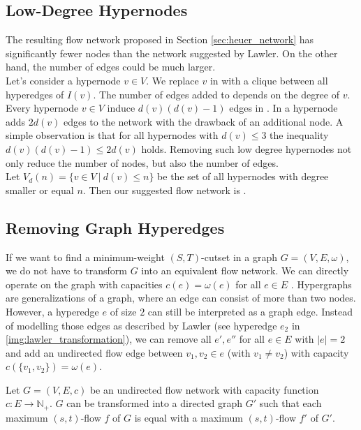 \subsection{Low-Degree Hypernodes}
\label{sec:degree_network}

The resulting flow network  proposed in Section \ref{sec:heuer_network} has significantly
fewer nodes than the network  suggested by Lawler. On the other hand, the number of
edges could be much larger. \\
Let's consider a hypernode $v \in V$. We replace $v$ in  with a clique between all
hyperedges of $I(v)$. The number of edges added to  depends on the degree of
$v$. Every hypernode $v \in V$ induce $d(v)(d(v) - 1)$ edges in . In  a hypernode adds $2d(v)$ edges to the network with the drawback
of an additional node. A simple observation is that for all hypernodes with $d(v) \le 3$ the inequality
$d(v)(d(v) - 1) \le 2d(v)$ holds. Removing such low degree hypernodes not only reduce
the number of nodes, but also the number of edges. \\
Let $V_{d}(n) = \{v \in V\ |\ d(v) \le n\}$ be the set of all hypernodes
with degree smaller or equal $n$. Then our suggested flow network is .

\subsection{Removing Graph Hyperedges}
\label{sec:edge_size_network}

If we want to find a minimum-weight $(S,T)$-cutset in a graph $G = (V,E,\omega)$, we do not have to transform
$G$ into an equivalent flow network. We can directly operate on the graph with capacities
$c(e) = \omega(e)$ for all $e \in E$ \cite{ford1956maximal}. Hypergraphs are generalizations of a graph, where
an edge can consist of more than two nodes. However, a hyperedge $e$ of size $2$ can still be 
interpreted as a graph edge. Instead of modelling those edges as described by Lawler \cite{lawler1973}
(see hyperedge $e_2$ in \autoref{img:lawler_transformation}), we can remove all $e',e''$ for all $e \in E$
with $|e| = 2$ and add an undirected flow edge between $v_1,v_2 \in e$ (with $v_1 \neq v_2$) with
capacity $c(\{v_1,v_2\}) = \omega(e)$.

\begin{lemma}
\label{lemma:undirected_transformation}
Let $G = (V,E,c)$ be an undirected flow network with capacity function $c: E \rightarrow \mathbb{N}_+$.
$G$ can be transformed into a directed graph $G'$ such that each maximum $(s,t)$-flow $f$ of $G$
is equal with a maximum $(s,t)$-flow $f'$ of $G'$.
\end{lemma}

